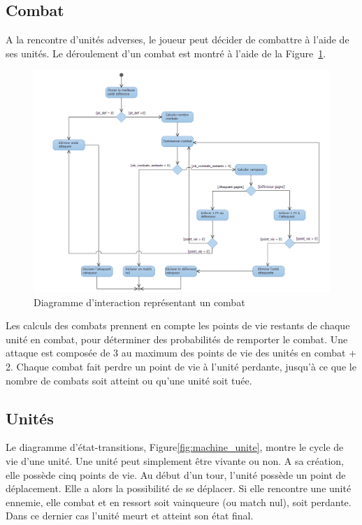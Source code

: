 \documentclass[a4paper]{article}
\begin{document}
	\subsection{Combat}
 A la rencontre d'unités adverses, le joueur peut décider de combattre à l'aide de ses unités. Le déroulement d'un combat est montré à l'aide de la Figure~\ref{fig:interaction_combat}.
\begin{figure}[ht]
\centering
	\includegraphics[width=1\textwidth, height=0.4\textheight]{../Schemas/Interaction_Combat.png}
		\caption{Diagramme d'interaction représentant un combat}
		\label{fig:interaction_combat}
\end{figure}

Les calculs des combats prennent en compte les points de vie restants de chaque unité en combat, pour déterminer des probabilités de remporter le combat. Une attaque est composée de 3 au maximum des points de vie des unités en combat + 2. Chaque combat fait perdre un point de vie à l'unité perdante, jusqu'à ce que le nombre de combats soit atteint ou qu'une unité soit tuée.

\clearpage
	\subsection{Unités}
Le diagramme d'état-transitions, Figure\ref{fig:machine_unite}, montre le cycle de vie d'une unité. Une unité peut simplement être vivante ou non.
A sa création, elle possède cinq points de vie.
Au début d'un tour, l'unité possède un point de déplacement. Elle a alors la possibilité de se déplacer. Si elle rencontre une unité ennemie, elle combat et en ressort soit vainqueure (ou match nul), soit perdante. Dans ce dernier cas l'unité meurt et atteint son état final.
\end{document}

